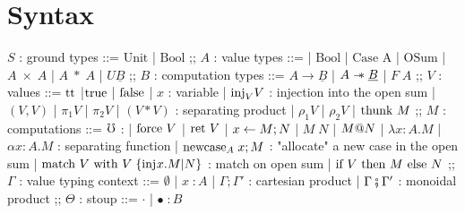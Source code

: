\documentclass{article}
\begin{document}

\section{Syntax}


\begin{bnf}
    $S$ : ground types ::= $\textrm{Unit}$
    | $\textrm{Bool}$
    ;;
    $A$ : value types ::= 
    | $\textrm{Bool}$
    | $\textrm{Case A}$ 
    | $\textrm{OSum}$
    | $A\; \times \; A$  
    | $A\; * \; A$
    | $U\underline{B}$
    ;;
    $B$ : computation types ::= $A \rightarrow \underline{B}$ 
    | $A \mathrel{-\mkern-6mu*} \underline{B}$
    | $F\;A$
    ;;
    $V$ : values ::= $\textrm{tt}$
    |$\textrm{true}$
    | $\textrm{false}$
    | $x$ : variable
    | $\textrm{inj}_{V}V$ : injection into the open sum
    | $(V,V)$
    | $\pi_1 V$
    | $\pi_2 V$
    | $(V*V)$ : separating product
    | $\rho_1 V$
    | $\rho_2 V$
    | $\textrm{thunk }M$
    ;;
    $M$ : computations ::= $\mho$ : 
    | $\textrm{force }V$
    | $\textrm{ret }V$
    | $x \leftarrow M ; N$
    | $M \; N$
    | $M \textrm{@} N$
    | $\lambda x \colon A . M$
    | $\alpha x \colon A . M$ : separating function
    | $\textrm{newcase}_{A} \; x ; M$ : "allocate" a new case in the open sum
    | $\textrm{match }V \textrm{ with }V \;\{\textrm{inj}_{}x . M | N\}$ : match on open sum
    | $\textrm{if }V \textrm{ then }M \textrm{ else }N$
    ;;
    $\Gamma$ : value typing context ::= $\emptyset$ 
    | $ x \; \colon A$
    | $\Gamma ; \Gamma'$ : cartesian product
    | $\Gamma \fatsemi \Gamma'$ : monoidal product
    ;;
    $\Theta$ : stoup ::= $\cdot$ 
    | $\bullet \; \colon B$
\end{bnf}
\end{document}
